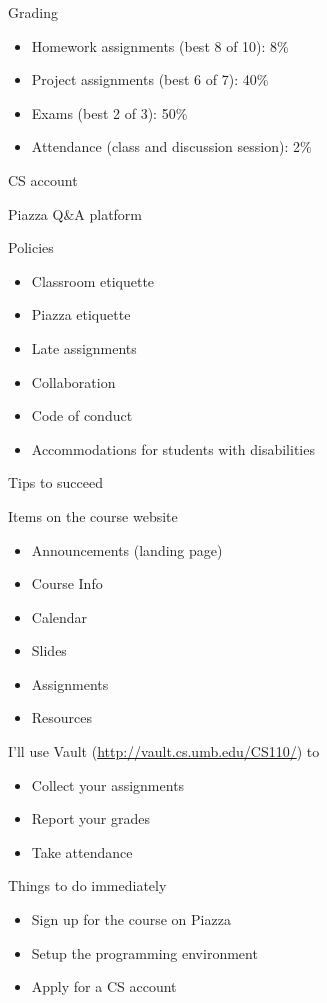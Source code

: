 \documentclass[8pt,a4paper,compress]{beamer}
\begin{document}
\begin{frame}[fragile]
\pause

Grading
\begin{itemize}
\item Homework assignments (best 8 of 10): 8\%
\item Project assignments (best 6 of 7): 40\%
\item Exams (best 2 of 3): 50\%
\item Attendance (class and discussion session): 2\%
\end{itemize}

\pause
\bigskip

CS account

\pause
\bigskip

Piazza Q\&A platform

\pause
\bigskip

Policies
\begin{itemize}
\item Classroom etiquette
\item Piazza etiquette
\item Late assignments
\item Collaboration
\item Code of conduct
\item Accommodations for students with disabilities
\end{itemize}

\pause
\bigskip

Tips to succeed
\end{frame}

\begin{frame}[fragile]
\pause

Items on the course website
\begin{itemize}
\item Announcements (landing page)
\item Course Info
\item Calendar
\item Slides 
\item Assignments
\item Resources
\end{itemize}

\pause
\bigskip

I'll use Vault (\href{http://vault.cs.umb.edu/CS110/}{http://vault.cs.umb.edu/CS110/}) to
\begin{itemize}
\item Collect your assignments
\item Report your grades
\item Take attendance
\end{itemize}

\pause
\bigskip

Things to do immediately
\begin{itemize}
\item Sign up for the course on Piazza
\item Setup the programming environment
\item Apply for a CS account
\end{itemize}
\end{frame}
\end{document}
